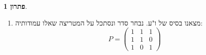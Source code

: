 \documentclass[12pt]{report}
\theoremstyle{plain}
\theoremstyle{definition}
\newtheorem*{solution}{פתרון}
\newcommand{\R}{\mathbb{R}}
\newcommand{\0}{\mathbf{0}}
\DeclareMathOperator{\Span}{Span}
\DeclareMathOperator{\Null}{N}
\begin{document}
\begin{solution}
\begin{enumerate}[label=\alph*.]
$$\begin{aligned}
\begin{pmatrix}
0 & 1 & -1\\
0 & 0 & 0
\end{pmatrix} \\
&=\Span\left(\begin{pmatrix}1\\1\\1\end{pmatrix}\right) \\
V_3&=\Null(3I_3-A)=\Null\begin{pmatrix}
-2 & 2 & 2\\
-2 & 2 & 2\\
-2 & 2 & 2
\end{pmatrix}=\Null\begin{pmatrix}
1 & -1 & -1\\
0 & 0 & 0\\
0 & 0 & 0
\end{pmatrix} \\
&=\Span\left(\begin{pmatrix}1\\1\\0\end{pmatrix},\begin{pmatrix}1\\0\\1\end{pmatrix}\right)
\end{aligned}
$$
לכן, הריבויים הגיאומטריים של 
$\lambda_1=1,\,\lambda_2=3$
הם
$$
g_1=a_1=1,\,g_2=a_2=2
$$
ותנאי משפט הלכסון (גרסה 
\ref{thm:diag2})
מתקיימים. כלומר 
$A$
לכסינה (ליתר דיוק, מעל
$\R$).


\item 
מצאנו בסיס של ו"ע. נבחר סדר ונסתכל על המטריצה שאלו עמודותיה:
$$
P=\begin{pmatrix}
1 & 1 & 1 \\ 
1 & 1 & 0 \\
1 & 0 & 1
\end{pmatrix}
$$


\end{enumerate}
\end{solution}
\end{document}
